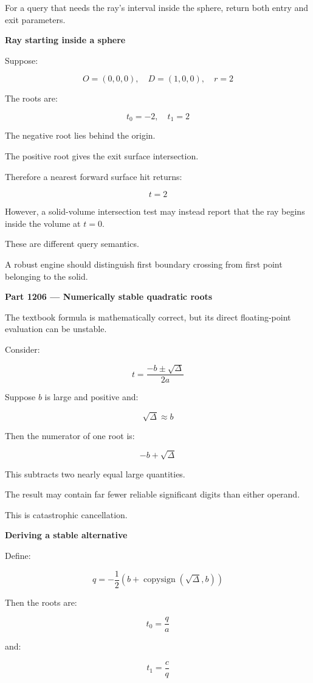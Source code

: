 For a query that needs the ray's interval inside the sphere, return both entry and exit parameters.

\textbf{Ray starting inside a sphere}

Suppose:

\[
O=(0,0,0),\quad D=(1,0,0),\quad r=2
\]

The roots are:

\[
t_0=-2,\quad t_1=2
\]

The negative root lies behind the origin.

The positive root gives the exit surface intersection.

Therefore a nearest forward surface hit returns:

\[
t=2
\]

However, a solid-volume intersection test may instead report that the ray begins inside the volume at \(t=0\).

These are different query semantics.

A robust engine should distinguish first boundary crossing from first point belonging to the solid.

\textbf{Part 1206 --- Numerically stable quadratic roots}

The textbook formula is mathematically correct, but its direct floating-point evaluation can be unstable.

Consider:

\[
t=\frac{-b\pm\sqrt{\Delta}}{2a}
\]

Suppose \(b\) is large and positive and:

\[
\sqrt{\Delta}\approx b
\]

Then the numerator of one root is:

\[
-b+\sqrt{\Delta}
\]

This subtracts two nearly equal large quantities.

The result may contain far fewer reliable significant digits than either operand.

This is catastrophic cancellation.

\textbf{Deriving a stable alternative}

Define:

\[
\boxed{ q=-\frac12\left(b+\operatorname{copysign}(\sqrt{\Delta},b)\right) }
\]

Then the roots are:

\[
\boxed{ t_0=\frac qa }
\]

and:

\[
\boxed{ t_1=\frac cq }
\]


